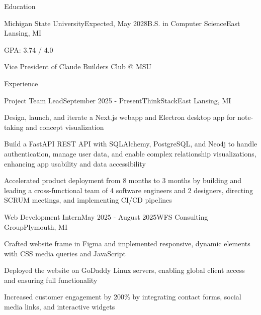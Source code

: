 \documentclass[
	11pt
]{../resume}
\begin{document}
	\begin{rSection}{E}{ducation}
		\begin{rSectionEntry}{Michigan State University}{Expected, May 2028}{B.S. in Computer Science}{East Lansing, MI}
			\item GPA: 3.74 / 4.0
			\item Vice President of Claude Builders Club @ MSU
		\end{rSectionEntry}
	\end{rSection}

	\begin{rSection}{E}{xperience}
		\begin{rSectionEntry}{Project Team Lead}{September 2025 - Present}{ThinkStack}{East Lansing, MI}
			\item Design, launch, and iterate a Next.js webapp and Electron desktop app for note-taking and concept visualization
			\item Build a FastAPI REST API with SQLAlchemy, PostgreSQL, and Neo4j to handle authentication, manage user data, and enable complex relationship visualizations, enhancing app usability and data accessibility
			\item Accelerated product deployment from 8 months to 3 months by building and leading a cross-functional team of 4 software engineers and 2 designers, directing SCRUM meetings, and implementing CI/CD pipelines
		\end{rSectionEntry}

		\begin{rSectionEntry}{Web Development Intern}{May 2025 - August 2025}{WFS Consulting Group}{Plymouth, MI}
			\item Crafted website frame in Figma and implemented responsive, dynamic elements with CSS media queries and JavaScript
			\item Deployed the website on GoDaddy Linux servers, enabling global client access and ensuring full functionality
			\item Increased customer engagement by 200\% by integrating contact forms, social media links, and interactive widgets
		\end{rSectionEntry}
	\end{rSection}
\end{document}
